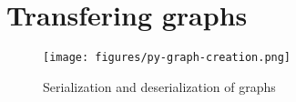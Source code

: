\section{Transfering graphs}
\begin{content}

\begin{figure}[H]
  \centering
  \texttt{[image: figures/py-graph-creation.png]}
  \caption{Serialization and deserialization of graphs}
  \label{fig:py-graph-creation}
\end{figure}

\end{content}
